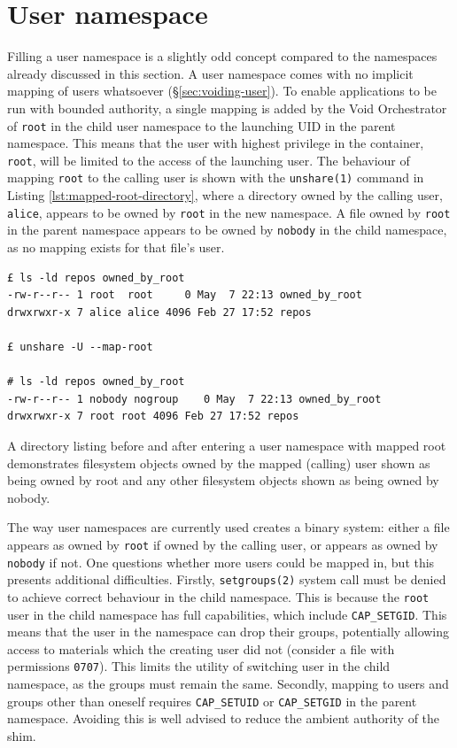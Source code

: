 \documentclass[12pt,a4paper,twoside]{report}
\begin{document}
\section{User namespace}
\label{sec:filling-user}

Filling a user namespace is a slightly odd concept compared to the namespaces already discussed in this section. A user namespace comes with no implicit mapping of users whatsoever (§\ref{sec:voiding-user}). To enable applications to be run with bounded authority, a single mapping is added by the Void Orchestrator of \texttt{root} in the child user namespace to the launching UID in the parent namespace. This means that the user with highest privilege in the container, \texttt{root}, will be limited to the access of the launching user. The behaviour of mapping \texttt{root} to the calling user is shown with the \texttt{unshare(1)} command in Listing \ref{lst:mapped-root-directory}, where a directory owned by the calling user, \texttt{alice}, appears to be owned by \texttt{root} in the new namespace. A file owned by \texttt{root} in the parent namespace appears to be owned by \texttt{nobody} in the child namespace, as no mapping exists for that file's user.

\begin{listing}
\begin{verbatim}
£ ls -ld repos owned_by_root
-rw-r--r-- 1 root  root     0 May  7 22:13 owned_by_root
drwxrwxr-x 7 alice alice 4096 Feb 27 17:52 repos

£ unshare -U --map-root

# ls -ld repos owned_by_root
-rw-r--r-- 1 nobody nogroup    0 May  7 22:13 owned_by_root
drwxrwxr-x 7 root root 4096 Feb 27 17:52 repos
\end{verbatim}

\caption{A directory listing before and after entering a user namespace with mapped root demonstrates filesystem objects owned by the mapped (calling) user shown as being owned by root and any other filesystem objects shown as being owned by nobody.}
\label{lst:mapped-root-directory}
\end{listing}

The way user namespaces are currently used creates a binary system: either a file appears as owned by \texttt{root} if owned by the calling user, or appears as owned by \texttt{nobody} if not. One questions whether more users could be mapped in, but this presents additional difficulties. Firstly, \texttt{setgroups(2)} system call must be denied to achieve correct behaviour in the child namespace. This is because the \texttt{root} user in the child namespace has full capabilities, which include \texttt{CAP\_SETGID}. This means that the user in the namespace can drop their groups, potentially allowing access to materials which the creating user did not (consider a file with permissions \texttt{0707}). This limits the utility of switching user in the child namespace, as the groups must remain the same. Secondly, mapping to users and groups other than oneself requires \texttt{CAP\_SETUID} or \texttt{CAP\_SETGID} in the parent namespace. Avoiding this is well advised to reduce the ambient authority of the shim.
\end{document}
